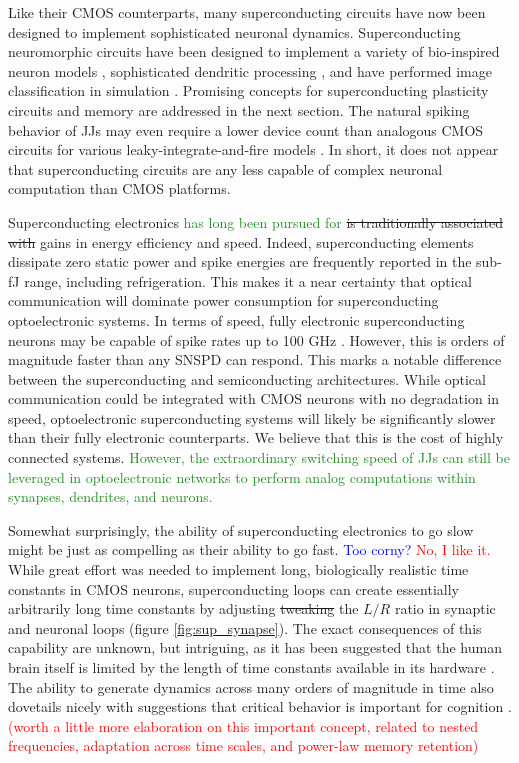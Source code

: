 \documentclass[twocolumn]{article}
\begin{document}
Like their CMOS counterparts, many superconducting circuits have now been designed to implement sophisticated neuronal dynamics. Superconducting neuromorphic circuits have been designed to implement a variety of bio-inspired neuron models \cite{crotty2010josephson, toomey2019design, schneider2018tutorial}, sophisticated dendritic processing \cite{shainline2019fluxonic}, and have performed image classification in simulation \cite{schneider2017energy}. Promising concepts for superconducting plasticity circuits and memory are addressed in the next section. The natural spiking behavior of JJs may even require a lower device count than analogous CMOS circuits for various leaky-integrate-and-fire models \cite{crotty2010josephson}. In short, it does not appear that superconducting circuits are any less capable of complex neuronal computation than CMOS platforms.

Superconducting electronics \textcolor{ForestGreen}{has long been pursued for} \sout{is traditionally associated with} gains in energy efficiency and speed. Indeed, superconducting elements dissipate zero static power and spike energies are frequently reported in the sub-fJ range, including refrigeration. This makes it a near certainty that optical communication will dominate power consumption for superconducting optoelectronic systems. In terms of speed, fully electronic superconducting neurons may be capable of spike rates up to 100 GHz \cite{schneider2017energy, schneider2018tutorial}. However, this is orders of magnitude faster than any SNSPD can respond. This marks a notable difference between the superconducting and semiconducting architectures. While optical communication could be integrated with CMOS neurons with no degradation in speed, optoelectronic superconducting systems will likely be significantly slower than their fully electronic counterparts. We believe that this is the cost of highly connected systems. \textcolor{ForestGreen}{However, the extraordinary switching speed of JJs can still be leveraged in optoelectronic networks to perform analog computations within synapses, dendrites, and neurons.}

Somewhat surprisingly, the ability of superconducting electronics to go slow might be just as compelling as their ability to go fast. \textcolor{blue}{Too corny?} \textcolor{red}{No, I like it.} While great effort was needed to implement long, biologically realistic time constants in CMOS neurons, superconducting loops can create essentially arbitrarily long time constants by adjusting \sout{tweaking} the $L/R$ ratio in synaptic and neuronal loops (figure \ref{fig:sup_synapse}). The exact consequences of this capability are unknown, but intriguing, as it has been suggested that the human brain itself is limited by the length of time constants available in its hardware \cite{indiveri2019importance}. The ability to generate dynamics across many orders of magnitude in time also dovetails nicely with suggestions that critical behavior is important for cognition \cite{cocchi2017criticality}. \textcolor{red}{(worth a little more elaboration on this important concept, related to nested frequencies, adaptation across time scales, and power-law memory retention)}
\end{document}
